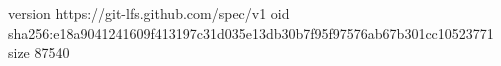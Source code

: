 version https://git-lfs.github.com/spec/v1
oid sha256:e18a9041241609f413197c31d035e13db30b7f95f97576ab67b301cc10523771
size 87540

